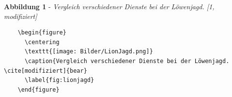 \documentclass["WS\space 16-17\space -\space LaTeX-Kurs\space -\space Praesentation\space -\space 3.tex"]{subfiles}
\begin{document}
\begin{frame}[fragile]
	\Losung
	\begin{outputbox}
		\vspace{-0.3cm}
		\begin{center}
			\textbf{Abbildung 1} - \textit{Vergleich verschiedener Dienste bei der Löwenjagd. [1, modifiziert]}
		\end{center}
		\vspace{-0.3cm}
	\end{outputbox}
	\Code
	\begin{lstlisting}
    \begin{figure}
      \centering
      \texttt{[image: Bilder/LionJagd.png]}
      \caption{Vergleich verschiedener Dienste bei der Löwenjagd. \cite[modifiziert]{bear}
      \label{fig:lionjagd}
    \end{figure}
	\end{lstlisting}
\end{frame}

\end{document}
